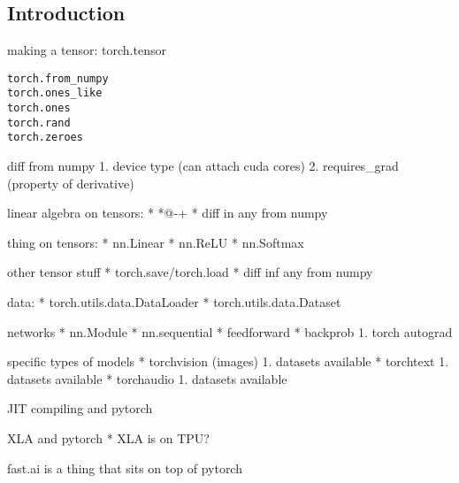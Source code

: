 
\subsection{Introduction}

making a tensor:
torch.tensor

\begin{verbatim}
torch.from_numpy
torch.ones_like
torch.ones
torch.rand
torch.zeroes
\end{verbatim}

diff from numpy
    1. device type (can attach cuda cores)
    2. requires\_grad (property of derivative)



linear algebra on tensors:
  * *@-+
  * diff in any from numpy

thing on tensors:
  * nn.Linear
  * nn.ReLU
  * nn.Softmax

other tensor stuff
  * torch.save/torch.load
  * diff inf any from numpy

data:
  * torch.utils.data.DataLoader
  * torch.utils.data.Dataset

networks
  * nn.Module
  * nn.sequential
  * feedforward
  * backprob
    1. torch autograd

specific types of models
  * torchvision (images)
    1. datasets available
  * torchtext
    1. datasets available
  * torchaudio
    1. datasets available


JIT compiling and pytorch

XLA and pytorch
  * XLA is on TPU?


fast.ai is a thing that sits on top of pytorch